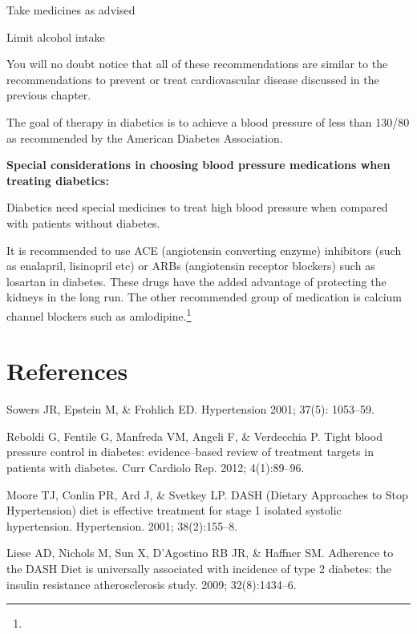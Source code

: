 { \item Take medicines as advised

 \item Limit alcohol intake

You will no doubt notice that all of these recommendations are similar to the recommendations to prevent or treat cardiovascular disease discussed in the previous chapter.

The goal of therapy in diabetics is to achieve a blood pressure of less than 130/80 as recommended by the American Diabetes Association.

\textbf{Special considerations in choosing blood pressure medications when treating diabetics:}

Diabetics need special medicines to treat high blood pressure when compared with patients without diabetes. 

It is recommended to use ACE (angiotensin converting enzyme) inhibitors (such as enalapril, lisinopril etc) or ARBs (angiotensin receptor blockers) such as losartan in diabetes. These drugs have the added advantage of protecting the kidneys in the long run. The other recommended group of medication is calcium channel blockers such as amlodipine.\footnote{}

\section*{References}

\begin{thebibliography}{99}
 Sowers JR, Epstein M, \& Frohlich ED. Hypertension 2001; 37(5): 1053–59.

  Reboldi G, Fentile G, Manfreda VM, Angeli F, \& Verdecchia P. Tight blood pressure control in diabetes: evidence–based review of treatment targets in patients with diabetes. Curr Cardiolo Rep. 2012; 4(1):89–96.

  Moore TJ, Conlin PR, Ard J, \& Svetkey LP. DASH (Dietary Approaches to Stop Hypertension) diet is effective treatment for stage 1 isolated systolic hypertension. Hypertension. 2001; 38(2):155–8.

  Liese AD, Nichols M, Sun X, D’Agostino RB JR, \& Haffner SM. Adherence to the DASH Diet is universally associated with incidence of type 2 diabetes: the insulin resistance atherosclerosis study. 2009; 32(8):1434–6.


\end{thebibliography}}
